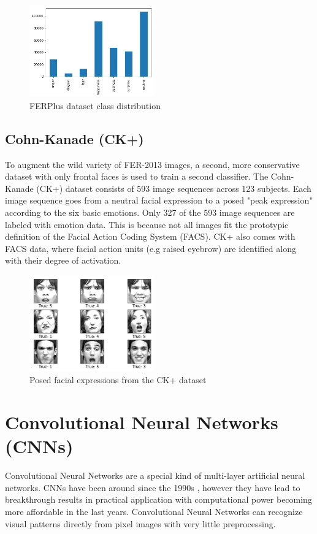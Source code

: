 \documentclass[twoside]{article}
\begin{document}
\begin{multicols}{2}
\begin{figure}[H]
	\includegraphics[width=0.48\textwidth]{ferplus_distribution}
	\caption{FERPlus dataset class distribution}
\end{figure}

\subsection{Cohn-Kanade (CK+)}
To augment the wild variety of FER-2013 images, a second, more conservative dataset with only frontal faces is used to train a second classifier. The Cohn-Kanade (CK+) dataset consists of 593 image sequences across 123 subjects. Each image sequence goes from a neutral facial expression to a posed "peak expression" according to the six basic emotions. Only 327 of the 593 image sequences are labeled with emotion data. This is because not all images fit the prototypic definition of the Facial Action Coding System (FACS). CK+ also comes with FACS data, where facial action units (e.g raised eyebrow) are identified along with their degree of activation.

\begin{figure}[H]
	\includegraphics[width=0.48\textwidth]{ckplus_examples}
	\caption{Posed facial expressions from the CK+ dataset}
\end{figure}


\section{Convolutional Neural Networks (CNNs)}
Convolutional Neural Networks are a special kind of multi-layer artificial neural networks. CNNs have been around since the 1990s \cite{lecun98}, however they have lead to breakthrough results in practical application with computational power becoming more affordable in the last years. Convolutional Neural Networks can recognize visual patterns directly from pixel images with very little preprocessing. 


\end{multicols}
\end{document}
